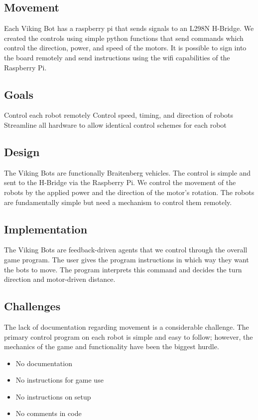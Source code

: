 \documentclass[a4paper,12pt]{article}
\begin{document}
\begin{enumerate}
\section{Movement}
Each Viking Bot has a raspberry pi that sends signals to an L298N H-Bridge. We created the controls using simple python functions that send commands which control the direction, power, and speed of the motors. It is possible to sign into the board remotely and send instructions using the wifi capabilities of the Raspberry Pi.

\subsection{Goals}
Control each robot remotely
Control speed, timing, and direction of robots
Streamline all hardware to allow identical control schemes for each robot

\subsection{Design}
The Viking Bots are functionally Braitenberg vehicles. The control is simple and sent to the H-Bridge via the Raspberry Pi. We control the movement of the robots by the applied power and the direction of the motor’s rotation. The robots are fundamentally simple but need a mechanism to control them remotely.

\subsection{Implementation}
The Viking Bots are feedback-driven agents that we control through the overall game program. The user gives the program instructions in which way they want the bots to move. The program interprets this command and decides the turn direction and motor-driven distance.

\subsection{Challenges}
The lack of documentation regarding movement is a considerable challenge. The primary control program on each robot is simple and easy to follow; however, the mechanics of the game and functionality have been the biggest hurdle. 
	\begin{itemize}
		\item No documentation
		\item No instructions for game use
		\item No instructions on setup
		\item No comments in code
	\end{itemize}


\end{enumerate}
\end{document}
